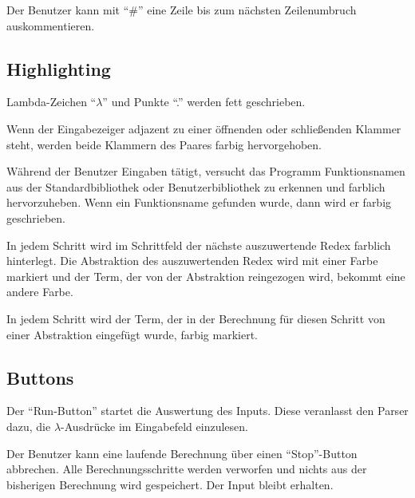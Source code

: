 \documentclass[parskip=full,11pt,twoside]{scrartcl}
\begin{document}
Der Benutzer kann mit \enquote{\#} eine Zeile bis zum nächsten Zeilenumbruch auskommentieren.

\subsection{Highlighting}

Lambda-Zeichen \enquote{$\lambda$} und Punkte \enquote{.} werden fett geschrieben.

Wenn der Eingabezeiger adjazent zu einer öffnenden oder schließenden Klammer steht, werden beide Klammern des Paares farbig hervorgehoben.

Während der Benutzer Eingaben tätigt, versucht das Programm Funktionsnamen aus der Standardbibliothek oder Benutzerbibliothek zu erkennen und farblich hervorzuheben. Wenn ein Funktionsname gefunden wurde, dann wird er farbig geschrieben.

In jedem Schritt wird im Schrittfeld der nächste auszuwertende Redex farblich hinterlegt.
Die Abstraktion des auszuwertenden Redex wird mit einer Farbe markiert und der Term, der von der Abstraktion reingezogen wird, bekommt eine andere Farbe.

In jedem Schritt wird der Term, der in der Berechnung für diesen Schritt von einer Abstraktion eingefügt wurde, farbig markiert.


\subsection{Buttons}

Der \enquote{Run-Button} startet die Auswertung des Inputs. Diese veranlasst den Parser dazu, die $\lambda$-Ausdrücke im Eingabefeld einzulesen.

Der Benutzer kann eine laufende Berechnung über einen \enquote{Stop}-Button abbrechen. Alle Berechnungsschritte werden verworfen und nichts aus der bisherigen Berechnung wird gespeichert. Der Input bleibt erhalten.
\end{document}
